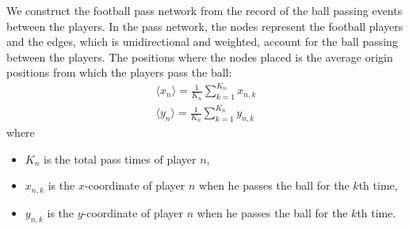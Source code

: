 \documentclass[12pt]{article}
\begin{document}
We construct the football pass network from the record of the ball passing events between the players. In the pass network, the nodes represent the football players and the edges, which is unidirectional and weighted, account for the ball passing between the players. The positions where the nodes placed is the average origin positions from which the players pass the ball:
\begin{gather}
	\label{meanx}\langle x_n\rangle=\frac{1}{K_n}\sum_{k=1}^{K_n}x_{n,k}\\
	\label{meany}\langle y_n\rangle=\frac{1}{K_n}\sum_{k=1}^{K_n}y_{n,k}
\end{gather}
where
\begin{itemize}
	\item[] $K_n$ is the total pass times of player $n$,
	\item[] $x_{n,k}$ is the $x$-coordinate of player $n$ when he passes the ball for the $k$th time,
	\item[] $y_{n,k}$ is the $y$-coordinate of player $n$ when he passes the ball for the $k$th time.
\end{itemize}
\end{document}
